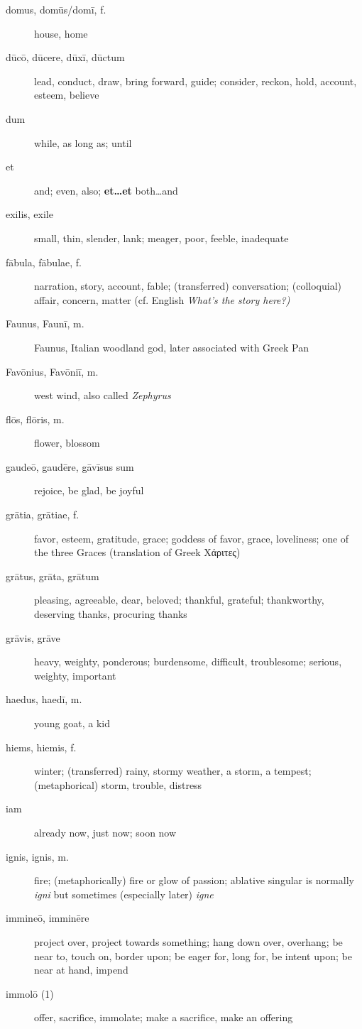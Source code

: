 \begin{description}
    \item[domus, domūs/domī, f.] house, home
    \item[dūcō, dūcere, dūxī, dūctum] lead, conduct, draw, bring forward, guide; consider, reckon, hold, account, esteem, believe
    \item[dum] while, as long as; until
    \item[et] and; even, also; \textbf{et\dots et} both\dots and
    \item[exilis, exile] small, thin, slender, lank; meager, poor, feeble, inadequate
    \item[fābula, fābulae, f.] narration, story, account, fable; (transferred) conversation; (colloquial) affair, concern, matter (cf. English \textit{What's the story here?)}
    \item[Faunus, Faunī, m.] Faunus, Italian woodland god, later associated with Greek Pan
    \item[Favōnius, Favōniī, m.] west wind, also called \textit{Zephyrus}
    \item[flōs, flōris, m.] flower, blossom
    \item[gaudeō, gaudēre, gāvīsus sum] rejoice, be glad, be joyful
\item[grātia, grātiae, f.] favor, esteem, gratitude, grace; goddess of favor, grace, loveliness; one of the three Graces (translation of Greek Χάριτες)
    \item[grātus, grāta, grātum] pleasing, agreeable, dear, beloved; thankful, grateful; thankworthy, deserving thanks, procuring thanks
    \item[grāvis, grāve] heavy, weighty, ponderous; burdensome, difficult, troublesome; serious, weighty, important
    \item[haedus, haedī, m.] young goat, a kid
    \item[hiems, hiemis, f.] winter; (transferred) rainy, stormy weather, a storm, a tempest; (metaphorical) storm, trouble, distress 
    \item[iam] already now, just now; soon now
    \item[ignis, ignis, m.] fire; (metaphorically) fire or glow of passion; ablative singular is normally \textit{igni} but sometimes (especially later) \textit{igne} 
    \item[immineō, imminēre] project over, project towards something; hang down over, overhang; be near to, touch on, border upon; be eager for, long for, be intent upon; be near at hand, impend
    \item[immolō (1)] offer, sacrifice, immolate; make a sacrifice, make an offering

\end{description}
